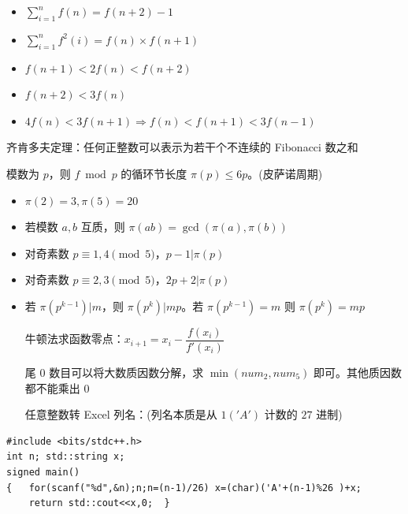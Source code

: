 \documentclass[twocolumn,10pt]{ctexart}
\begin{document}
\begin{itemize}
\item $\sum_{i=1}^nf(n)=f(n+2)-1$
\end{itemize}

\begin{itemize}
\item $\sum_{i=1}^nf^2(i)=f(n)\times f(n+1)$
\end{itemize}

\begin{itemize}
\item $f(n+1)<2f(n)<f(n+2)$
\end{itemize}

\begin{itemize}
\item $f(n+2)<3f(n)$
\end{itemize}

\begin{itemize}
\item $4f(n)<3f(n+1)\Rightarrow f(n)<f(n+1)<3f(n-1)$
\end{itemize}

\begin{notebox}
齐肯多夫定理：任何正整数可以表示为若干个不连续的 Fibonacci 数之和
\end{notebox}

模数为 $p$，则 $f\bmod p$ 的循环节长度 $\pi(p)\le 6p$。(皮萨诺周期)

\begin{itemize}
\item $\pi(2)=3,\pi(5)=20$
\item 若模数 $a,b$ 互质，则 $\pi(ab)=\gcd(\pi(a),\pi(b))$
\item 对奇素数 $p\equiv1,4\pmod5$，$p-1|\pi(p)$
\item 对奇素数 $p\equiv2,3\pmod5$，$2p+2|\pi(p)$
\item 若 $\pi(p^{k-1})|m$，则 $\pi(p^k)|mp$。若 $\pi(p^{k-1})=m$ 则 $\pi(p^k)=mp$

牛顿法求函数零点：$x_{i+1}=x_i-\dfrac{f(x_i)}{f'(x_i)}$

尾 $0$ 数目可以将大数质因数分解，求 $\min(num_2,num_5)$ 即可。其他质因数都不能乘出 $0$

任意整数转 Excel 列名：(列名本质是从 $1('A')$ 计数的 $27$ 进制)
\end{itemize}

\begin{verbatim}
#include <bits/stdc++.h>
int n; std::string x;
signed main()
{   for(scanf("%d",&n);n;n=(n-1)/26) x=(char)('A'+(n-1)%26 )+x;
    return std::cout<<x,0;  }
\end{verbatim}
\end{document}
